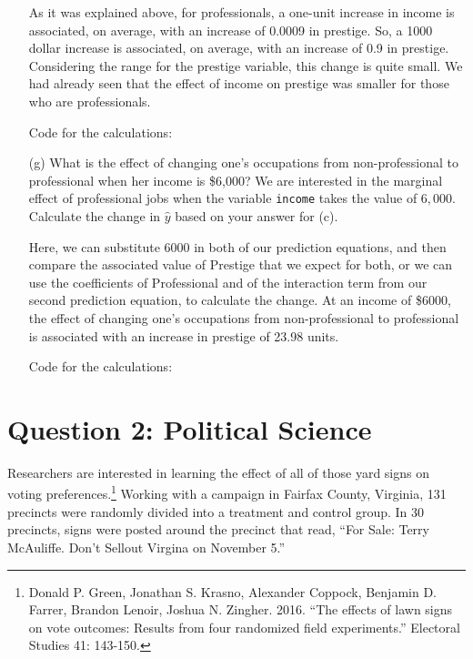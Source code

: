 \documentclass[12pt,letterpaper]{article}
\begin{document}
\begin{enumerate}
 	As it was explained above, for professionals, a one-unit increase in income is associated, on average, with an increase of 0.0009 in prestige. So, a 1000 dollar increase is associated, on average, with an increase
 	of 0.9 in prestige. Considering the range for the prestige variable, this change is quite small. We had already seen that the effect of income on prestige was smaller for those who are professionals. 
 	
 	Code for the calculations: 
 	
 	 		
	
    \newpage
	
	\item [(g)]
	What is the effect of changing one's occupations from non-professional to professional when her income is \$6,000? We are interested in the marginal effect of professional jobs when the variable \texttt{income} takes the value of $6,000$. Calculate the change in $\hat{y}$ based on your answer for (c).
	\vspace{0.5cm}
	
	Here, we can substitute 6000 in both of our prediction equations, and then compare the associated value of Prestige that we expect for both, or we can use the coefficients of Professional and of the interaction term from our second prediction equation, to calculate the change. At an income of \$6000, the effect of changing one's occupations from non-professional to professional is associated with an increase in prestige of 23.98 units. 
	
	Code for the calculations: 	
	
	 	
	
	
\end{enumerate}

\newpage

\section*{Question 2: Political Science}
\vspace{.25cm}

\noindent 	Researchers are interested in learning the effect of all of those yard signs on voting preferences.\footnote{Donald P. Green, Jonathan	S. Krasno, Alexander Coppock, Benjamin D. Farrer,	Brandon Lenoir, Joshua N. Zingher. 2016. ``The effects of lawn signs on vote outcomes: Results from four randomized field experiments.'' Electoral Studies 41: 143-150. } Working with a campaign in Fairfax County, Virginia, 131 precincts were randomly divided into a treatment and control group. In 30 precincts, signs were posted around the precinct that read, ``For Sale: Terry McAuliffe. Don't Sellout Virgina on November 5.'' \\
\end{document}
